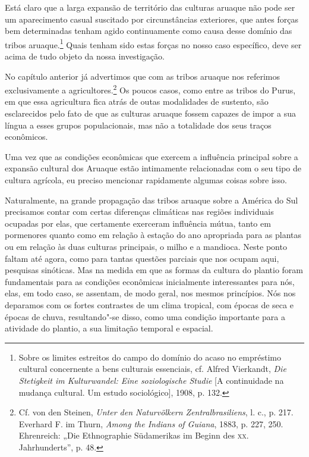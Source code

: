 Está claro que a larga expansão de território das culturas aruaque não
pode ser um aparecimento casual suscitado por circunstâncias exteriores,
que antes forças bem determinadas tenham agido continuamente como causa
desse domínio das tribos aruaque.\footnote{Sobre os limites estreitos do
  campo do domínio do acaso no empréstimo cultural concernente a bens
  culturais essenciais, cf. Alfred Vierkandt, \emph{Die Stetigkeit im
  Kulturwandel: Eine soziologische Studie} {[}A continuidade na mudança
  cultural. Um estudo sociológico{]}, 1908, p. 132.} Quais tenham sido
estas forças no nosso caso específico, deve ser acima de tudo objeto da
nossa investigação.

No capítulo anterior já advertimos que com as tribos aruaque nos
referimos exclusivamente a agricultores.\footnote{Cf. von den Steinen,
  \emph{Unter den Naturvölkern Zentralbrasiliens}, l. c., p. 217.
  Everhard F. im Thurn, \emph{Among the Indians of Guiana}, 1883, p.
  227, 250. Ehrenreich: „Die Ethnographie Südamerikas im Beginn des \textsc{xx}.
  Jahrhunderts'', p. 48.} Os poucos casos, como entre as tribos do
Purus, em que essa agricultura fica atrás de outas modalidades de
sustento, são esclarecidos pelo fato de que as culturas aruaque fossem
capazes de impor a sua língua a esses grupos populacionais, mas não a
totalidade dos seus traços econômicos.

Uma vez que as condições econômicas que exercem a influência principal
sobre a expansão cultural dos Aruaque estão intimamente relacionadas com
o seu tipo de cultura agrícola, eu preciso mencionar rapidamente algumas
coisas sobre isso.

Naturalmente, na grande propagação das tribos aruaque sobre a América do
Sul precisamos contar com certas diferenças climáticas nas regiões
individuais ocupadas por elas, que certamente exerceram influência
mútua, tanto em pormenores quanto como em relação à estação do ano
apropriada para as plantas ou em relação às duas culturas principais, o
milho e a mandioca. Neste ponto faltam até agora, como para tantas
questões parciais que nos ocupam aqui, pesquisas sinóticas. Mas na
medida em que as formas da cultura do plantio foram fundamentais para as
condições econômicas inicialmente interessantes para nós, elas, em todo
caso, se assentam, de modo geral, nos mesmos princípios. Nós nos
deparamos com os fortes contrastes de um clima tropical, com épocas de
seca e épocas de chuva, resultando"-se disso, como uma condição
importante para a atividade do plantio, a sua limitação temporal e
espacial.

